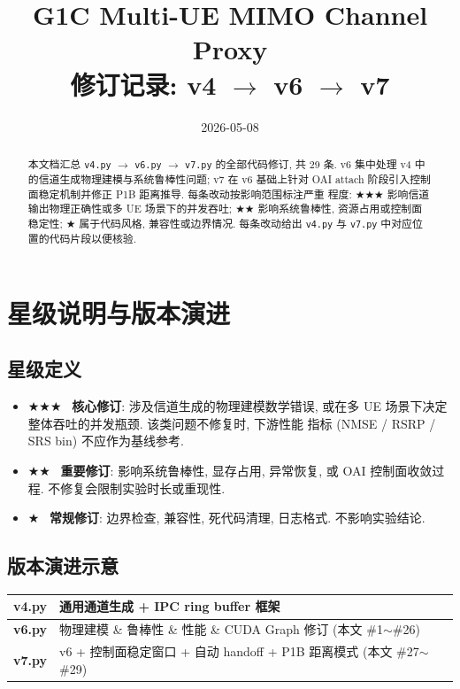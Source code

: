 \documentclass[11pt,a4paper,UTF8,fontset=fandol]{ctexart}
\title{\textbf{G1C Multi-UE MIMO Channel Proxy} \\[0.4em]
       \large 修订记录: v4 $\to$ v6 $\to$ v7}
\author{}
\date{2026-05-08}
\newcommand{\sone}{\textcolor{starcolor}{$\bigstar$}}
\newcommand{\stwo}{\textcolor{starcolor}{$\bigstar\bigstar$}}
\newcommand{\sthree}{\textcolor{starcolor}{$\bigstar\bigstar\bigstar$}}
\newcommand{\vfour}{\texttt{v4.py}}
\newcommand{\vsix}{\texttt{v6.py}}
\newcommand{\vseven}{\texttt{v7.py}}
\begin{document}
\maketitle

\begin{abstract}
\noindent
本文档汇总 \vfour{} $\to$ \vsix{} $\to$ \vseven{} 的全部代码修订, 共 29 条.
v6 集中处理 v4 中的信道生成物理建模与系统鲁棒性问题; v7 在 v6 基础上针对 OAI
attach 阶段引入控制面稳定机制并修正 P1B 距离推导. 每条改动按影响范围标注严重
程度: \sthree{} 影响信道输出物理正确性或多 UE 场景下的并发吞吐;
\stwo{} 影响系统鲁棒性, 资源占用或控制面稳定性; \sone{} 属于代码风格,
兼容性或边界情况. 每条改动给出 \vfour{} 与 \vseven{} 中对应位置的代码片段以便核验.
\end{abstract}

\tableofcontents
\vspace{1em}

\section{星级说明与版本演进}
\label{sec:overview}

\subsection{星级定义}
\begin{itemize}
  \item \sthree{} \ \textbf{核心修订}: 涉及信道生成的物理建模数学错误,
        或在多 UE 场景下决定整体吞吐的并发瓶颈. 该类问题不修复时, 下游性能
        指标 (NMSE / RSRP / SRS bin) 不应作为基线参考.
  \item \stwo{} \ \textbf{重要修订}: 影响系统鲁棒性, 显存占用,
        异常恢复, 或 OAI 控制面收敛过程. 不修复会限制实验时长或重现性.
  \item \sone{} \ \textbf{常规修订}: 边界检查, 兼容性, 死代码清理,
        日志格式. 不影响实验结论.
\end{itemize}

\subsection{版本演进示意}
\begin{center}
\renewcommand{\arraystretch}{1.25}
\begin{tabular}{>{\bfseries}l p{12cm}}
\toprule
v4.py & 通用通道生成 + IPC ring buffer 框架 \\
\midrule
v6.py & 物理建模 \& 鲁棒性 \& 性能 \& CUDA Graph 修订 (本文 \#1$\sim$\#26) \\
\midrule
v7.py & v6 + 控制面稳定窗口 + 自动 handoff + P1B 距离模式 (本文 \#27$\sim$\#29) \\
\bottomrule
\end{tabular}
\end{center}
\end{document}
